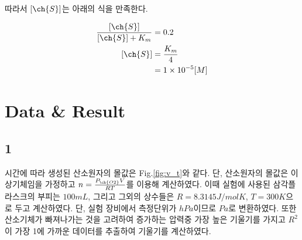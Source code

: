 \documentclass[%
 reprint,
 amsmath,amssymb,
 aps,
]{revtex4-2}
\begin{document}
따라서 $[\ch{S}]$는 아래의 식을 만족한다.

\begin{align}
	\frac{[\ch{S}]}{[\ch{S}] + K_{m}} &= 0.2\\
	[\ch{S}] &= \frac{K_{m}}{4}\\
	&= 1\times 10^{-5} [M]
\end{align}

\section{\label{sec:level1}Data \& Result}
\subsection{\label{sec:level2} 1}
시간에 따라 생성된 산소원자의 몰값은 Fig.\ref{fig:v_t}와 같다. 단, 산소원자의 몰값은 이상기체임을 가정하고 $n=\frac{P_{\ch{O2}}V}{RT}$를 이용해 계산하였다. 이때 실험에 사용된 삼각플라스크의 부피는 $100mL$, 그리고 그외의 상수들은 $R=8.3145J/mol K$, $T=300K$으로 두고 계산하였다. 단, 실험 장비에서 측정단위가 $hPa$이므로 $Pa$로 변환하였다. 또한 산소기체가 빠져나가는 것을 고려하여 증가하는 압력중 가장 높은 기울기를 가지고 $R^{2}$이 가장 1에 가까운 데이터를 추출하여 기울기를 계산하였다.
\end{document}
